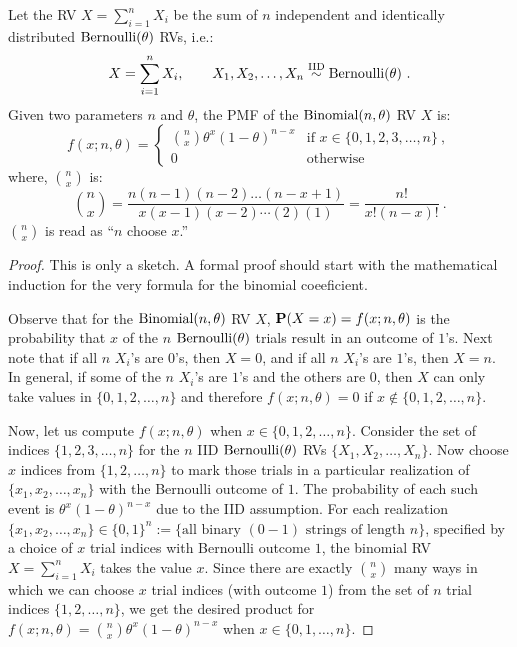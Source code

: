 \begin{model}\label{M:binomial}
Let the RV $X=\sum_{i=1}^n X_i$ be the sum of $n$ independent and identically distributed $\mbox{{\rm Bernoulli}}(\theta)$ RVs, i.e.:
\[
X=\sum_{i=1}^n X_i, \qquad X_1,X_2,\ldots,X_n \overset{{\rm IID}}{\sim} \mbox{{\rm Bernoulli}}(\theta) \ .
\]
Given two parameters $n$ and $\theta$, the PMF of the $\mbox{{\rm Binomial}}(n,\theta)$ RV $X$ is:
\begin{equation}
 f(x; n,\theta) =
 \begin{cases}
 \displaystyle\binom{n}{x} \theta^x (1-\theta)^{n-x} & \text{if $x \in \{0,1,2,3,\ldots,n\}$} \ ,\\
 0 & \text{otherwise}
 \end{cases}
 \end{equation}
where, $\binom{n}{x}$ is:
\[
\binom{n}{x} = \frac{n(n-1)(n-2)\ldots(n-x+1)}{x(x-1)(x-2)\cdots (2)(1)} =  \frac{n !}{x! (n-x)!} \ .
 \]
$\binom{n}{x}$ is read as ``$n$ choose $x$.''
 \end{model}
\begin{proof} This is only a sketch. A formal proof should start with the mathematical induction for the very formula for the binomial coeeficient.

Observe that for the $\mbox{{\rm Binomial}}(n,\theta)$ RV $X$, $\mathbf{P}(X=x) = f(x;n,\theta)$ is the probability that $x$ of the $n$ $\mbox{{\rm Bernoulli}}(\theta)$ trials result in an outcome of $1$'s.  Next note that if all $n$ $X_i$'s are $0$'s, then $X=0$, and if all $n$ $X_i$'s are $1$'s, then $X=n$.  In general, if some of the $n$ $X_i$'s are $1$'s and the others are $0$, then $X$ can only take values in $\{0,1,2,\ldots,n\}$ and therefore $f(x;n,\theta)=0$ if $x \notin \{0,1,2,\ldots,n\}$.

Now, let us compute $f(x;n,\theta)$ when $x\in\{0,1,2,\ldots,n\}$.  Consider the set of indices $\{1,2,3,\ldots,n\}$ for the $n$ IID $\mbox{{\rm Bernoulli}}(\theta)$ RVs $\{X_1,X_2,\ldots,X_n\}$.  Now choose $x$ indices from $\{1,2,\ldots,n\}$ to mark those trials in a particular realization of $\{x_1,x_2,\ldots,x_n\}$ with the Bernoulli outcome of $1$.  The probability of each such event is $\theta^x (1-\theta)^{n-x}$ due to the IID assumption.  For each realization $\{x_1,x_2,\ldots,x_n\} \in \{0,1\}^{n} := \{ \text{all binary $(0-1)$ strings of length $n$}\}$, specified by a choice of $x$ trial indices with Bernoulli outcome $1$, the binomial RV $X=\sum_{i=1}^n X_i$ takes the value $x$.  Since there are exactly $\binom{n}{x}$ many ways in which we can choose $x$ trial indices (with outcome $1$) from the set of $n$ trial indices $\{1,2,\ldots,n\}$, we get the desired product for $f(x; n,\theta) = \binom{n}{x} \theta^x (1-\theta)^{n-x}$ when $x \in \{0,1,\ldots,n\}$.
\end{proof}
